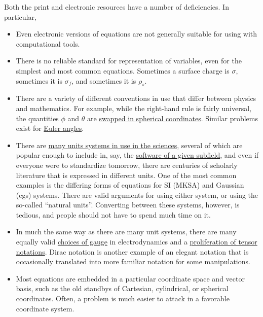 \documentclass[12pt,letterpaper]{article}
\begin{document}
Both the print and electronic resources have a number of deficiencies.
In particular,
\begin{itemize}
\item Even electronic versions of equations are not generally suitable for using with computational tools.
\item There is no reliable standard for representation of variables,
      even for the simplest and most common equations.
      Sometimes a surface charge is $\sigma$,
      sometimes it is $\sigma_f$,
      and sometimes it is $\rho_s$.
\item There are a variety of different conventions in use that differ between physics and mathematics.
      For example,
      while the right-hand rule is fairly universal,
      the quantities $\phi$ and $\theta$ are
      \href{http://mathworld.wolfram.com/SphericalCoordinates.html}
      {swapped in spherical coordinates}.
      Similar problems exist for
      \href{http://mathworld.wolfram.com/EulerAngles.html}
      {Euler angles}.
\item There are
      \href{https://en.wikipedia.org/wiki/Systems_of_units}
      {many units systems in use in the sciences},
      several of which are popular enough to include in, say, the
      \href{http://lammps.sandia.gov/doc/units.html}
      {software of a given subfield},
      and even if everyone were to standardize tomorrow,
      there are centuries of scholarly literature that is expressed in different units.
      One of the most common examples is the differing forms of equations for SI (MKSA) and Gaussian (cgs) systems.
      There are valid arguments for using either system,
      or using the so-called ``natural units''.
      Converting between these systems, however, is tedious,
      and people should not have to spend much time on it.
\item In much the same way as there are many unit systems,
      there are many equally valid
      \href{https://en.wikipedia.org/wiki/Gauge_fixing}
      {choices of gauge}
      in electrodynamics and a
      \href{https://en.wikipedia.org/wiki/Tensor_notation}
      {proliferation of tensor notations}.
      Dirac notation is another example of an elegant notation
      that is occasionally translated into more familiar notation for some manipulations.
\item Most equations are embedded in a particular coordinate space and vector basis,
      such as the old standbys of Cartesian, cylindrical, or spherical coordinates.
      Often, a problem is much easier to attack in a favorable coordinate system.

\end{itemize}
\end{document}
